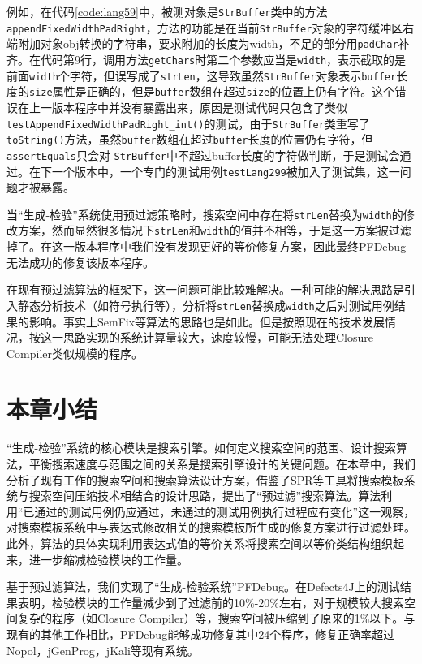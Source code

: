 例如，在代码\ref{code:lang59}中，被测对象是\texttt{StrBuffer}类中的方法\texttt{appendFixedWidthPadRight}，方法的功能是在当前\texttt{StrBuffer}对象的字符缓冲区右端附加对象obj转换的字符串，要求附加的长度为width，不足的部分用\texttt{padChar}补齐。在代码第9行，调用方法\texttt{getChars}时第二个参数应当是\texttt{width}，表示截取的是前面\texttt{width}个字符，但误写成了\texttt{strLen}，这导致虽然\texttt{StrBuffer}对象表示\texttt{buffer}长度的\texttt{size}属性是正确的，但是\texttt{buffer}数组在超过\texttt{size}的位置上仍有字符。这个错误在上一版本程序中并没有暴露出来，原因是测试代码只包含了类似\texttt{testAppendFixedWidthPadRight\_int()}的测试，由于\texttt{StrBuffer}类重写了\texttt{toString()}方法，虽然\texttt{buffer}数组在超过\texttt{buffer}长度的位置仍有字符，但\texttt{assertEquals}只会对
\texttt{StrBuffer}中不超过buffer长度的字符做判断，于是测试会通过。在下一个版本中，一个专门的测试用例\texttt{testLang299}被加入了测试集，这一问题才被暴露。

当“生成-检验”系统使用预过滤策略时，搜索空间中存在将\texttt{strLen}替换为\texttt{width}的修改方案，然而显然很多情况下\texttt{strLen}和\texttt{width}的值并不相等，于是这一方案被过滤掉了。在这一版本程序中我们没有发现更好的等价修复方案，因此最终PFDebug无法成功的修复该版本程序。

在现有预过滤算法的框架下，这一问题可能比较难解决。一种可能的解决思路是引入静态分析技术（如符号执行等），分析将\texttt{strLen}替换成\texttt{width}之后对测试用例结果的影响。事实上SemFix等算法的思路也是如此。但是按照现在的技术发展情况，按这一思路实现的系统计算量较大，速度较慢，可能无法处理Closure Compiler类似规模的程序。



\section{本章小结}%
“生成-检验”系统的核心模块是搜索引擎。如何定义搜索空间的范围、设计搜索算法，平衡搜索速度与范围之间的关系是搜索引擎设计的关键问题。在本章中，我们分析了现有工作的搜索空间和搜索算法设计方案，借鉴了SPR等工具将搜索模板系统与搜索空间压缩技术相结合的设计思路，提出了“预过滤”搜索算法。算法利用“已通过的测试用例仍应通过，未通过的测试用例执行过程应有变化”这一观察，对搜索模板系统中与表达式修改相关的搜索模板所生成的修复方案进行过滤处理。此外，算法的具体实现利用表达式值的等价关系将搜索空间以等价类结构组织起来，进一步缩减检验模块的工作量。

基于预过滤算法，我们实现了“生成-检验系统”PFDebug。在Defects4J上的测试结果表明，检验模块的工作量减少到了过滤前的10\%-20\%左右，对于规模较大搜索空间复杂的程序（如Closure Compiler）等，搜索空间被压缩到了原来的1\%以下。与现有的其他工作相比，PFDebug能够成功修复其中24个程序，修复正确率超过Nopol，jGenProg，jKali等现有系统。